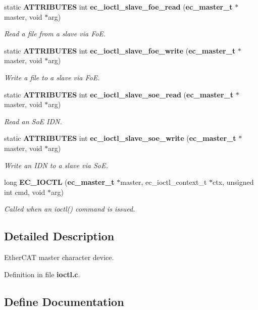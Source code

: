 \begin{DoxyCompactItemize}
static {\bf \-A\-T\-T\-R\-I\-B\-U\-T\-E\-S} int {\bf ec\-\_\-ioctl\-\_\-slave\-\_\-foe\-\_\-read} ({\bf ec\-\_\-master\-\_\-t} $\ast$master, void $\ast$arg)
\begin{DoxyCompactList}\small\item\em \-Read a file from a slave via \-Fo\-E. \end{DoxyCompactList}\item 
static {\bf \-A\-T\-T\-R\-I\-B\-U\-T\-E\-S} int {\bf ec\-\_\-ioctl\-\_\-slave\-\_\-foe\-\_\-write} ({\bf ec\-\_\-master\-\_\-t} $\ast$master, void $\ast$arg)
\begin{DoxyCompactList}\small\item\em \-Write a file to a slave via \-Fo\-E. \end{DoxyCompactList}\item 
static {\bf \-A\-T\-T\-R\-I\-B\-U\-T\-E\-S} int {\bf ec\-\_\-ioctl\-\_\-slave\-\_\-soe\-\_\-read} ({\bf ec\-\_\-master\-\_\-t} $\ast$master, void $\ast$arg)
\begin{DoxyCompactList}\small\item\em \-Read an \-So\-E \-I\-D\-N. \end{DoxyCompactList}\item 
static {\bf \-A\-T\-T\-R\-I\-B\-U\-T\-E\-S} int {\bf ec\-\_\-ioctl\-\_\-slave\-\_\-soe\-\_\-write} ({\bf ec\-\_\-master\-\_\-t} $\ast$master, void $\ast$arg)
\begin{DoxyCompactList}\small\item\em \-Write an \-I\-D\-N to a slave via \-So\-E. \end{DoxyCompactList}\item 
long {\bf \-E\-C\-\_\-\-I\-O\-C\-T\-L} ({\bf ec\-\_\-master\-\_\-t} $\ast$master, ec\-\_\-ioctl\-\_\-context\-\_\-t $\ast$ctx, unsigned int cmd, void $\ast$arg)
\begin{DoxyCompactList}\small\item\em \-Called when an ioctl() command is issued. \end{DoxyCompactList}\end{DoxyCompactItemize}


\subsection{\-Detailed \-Description}
\-Ether\-C\-A\-T master character device. 

\-Definition in file {\bf ioctl.\-c}.



\subsection{\-Define \-Documentation}
